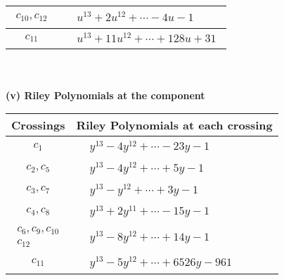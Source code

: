 \documentclass[1p]{elsarticle_modified}
\theoremstyle{definition}
\begin{document}
\begin{tabular}{m{50pt}|m{274pt}}
\hline $$\begin{aligned}c_{10},c_{12}\end{aligned}$$&$\begin{aligned}
&u^{13}+2 u^{12}+\cdots-4 u-1
\end{aligned}$\\
\hline $$\begin{aligned}c_{11}\end{aligned}$$&$\begin{aligned}
&u^{13}+11 u^{12}+\cdots+128 u+31
\end{aligned}$\\
\hline
\end{tabular}\\~\\
\newpage\renewcommand{\arraystretch}{1}
\flushleft \textbf{(v) Riley Polynomials at the component}\newline \\
\begin{tabular}{m{50pt}|m{274pt}}
Crossings & \hspace{64pt}Riley Polynomials at each crossing \\
\hline $$\begin{aligned}c_{1}\end{aligned}$$&$\begin{aligned}
&y^{13}-4 y^{12}+\cdots-23 y-1
\end{aligned}$\\
\hline $$\begin{aligned}c_{2},c_{5}\end{aligned}$$&$\begin{aligned}
&y^{13}-4 y^{12}+\cdots+5 y-1
\end{aligned}$\\
\hline $$\begin{aligned}c_{3},c_{7}\end{aligned}$$&$\begin{aligned}
&y^{13}- y^{12}+\cdots+3 y-1
\end{aligned}$\\
\hline $$\begin{aligned}c_{4},c_{8}\end{aligned}$$&$\begin{aligned}
&y^{13}+2 y^{11}+\cdots-15 y-1
\end{aligned}$\\
\hline $$\begin{aligned}c_{6},c_{9},c_{10}\\c_{12}\end{aligned}$$&$\begin{aligned}
&y^{13}-8 y^{12}+\cdots+14 y-1
\end{aligned}$\\
\hline $$\begin{aligned}c_{11}\end{aligned}$$&$\begin{aligned}
&y^{13}-5 y^{12}+\cdots+6526 y-961
\end{aligned}$\\
\hline
\end{tabular}\\~\\
\end{document}

